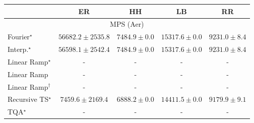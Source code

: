 \begin{tabular}{l|cccc|}
\toprule
            & ER & HH & LB & RR \\
\midrule
\multicolumn{5}{c}{\rule{0pt}{8pt}MPS (Aer)} \\
\midrule
Fourier$^\star$ & {\cellcolor[HTML]{4D004B}} \color[HTML]{F1F1F1} $56682.2\pm 2535.8$ & {\cellcolor[HTML]{F5FAFC}} \color[HTML]{000000} $7484.9\pm 0.0$ & {\cellcolor[HTML]{D4E3EF}} \color[HTML]{000000} $15317.6\pm 0.0$ & {\cellcolor[HTML]{EEF6FA}} \color[HTML]{000000} $9231.0\pm 8.4$ \\
Interp.$^\star$ & {\cellcolor[HTML]{4D004B}} \color[HTML]{F1F1F1} $56598.1\pm 2542.4$ & {\cellcolor[HTML]{F5FAFC}} \color[HTML]{000000} $7484.9\pm 0.0$ & {\cellcolor[HTML]{D4E3EF}} \color[HTML]{000000} $15317.6\pm 0.0$ & {\cellcolor[HTML]{EEF6FA}} \color[HTML]{000000} $9231.0\pm 8.4$ \\
Linear Ramp$^\star$ & {\cellcolor[HTML]{000000}} \color[HTML]{F1F1F1} {\cellcolor{white}} \color{black} - & {\cellcolor[HTML]{000000}} \color[HTML]{F1F1F1} {\cellcolor{white}} \color{black} - & {\cellcolor[HTML]{000000}} \color[HTML]{F1F1F1} {\cellcolor{white}} \color{black} - & {\cellcolor[HTML]{000000}} \color[HTML]{F1F1F1} {\cellcolor{white}} \color{black} - \\
Linear Ramp & {\cellcolor[HTML]{000000}} \color[HTML]{F1F1F1} {\cellcolor{white}} \color{black} - & {\cellcolor[HTML]{000000}} \color[HTML]{F1F1F1} {\cellcolor{white}} \color{black} - & {\cellcolor[HTML]{000000}} \color[HTML]{F1F1F1} {\cellcolor{white}} \color{black} - & {\cellcolor[HTML]{000000}} \color[HTML]{F1F1F1} {\cellcolor{white}} \color{black} - \\
Linear Ramp$^\dagger$ & {\cellcolor[HTML]{000000}} \color[HTML]{F1F1F1} {\cellcolor{white}} \color{black} - & {\cellcolor[HTML]{000000}} \color[HTML]{F1F1F1} {\cellcolor{white}} \color{black} - & {\cellcolor[HTML]{000000}} \color[HTML]{F1F1F1} {\cellcolor{white}} \color{black} - & {\cellcolor[HTML]{000000}} \color[HTML]{F1F1F1} {\cellcolor{white}} \color{black} - \\
Recursive TS$^\star$ & {\cellcolor[HTML]{F6FBFC}} \color[HTML]{000000} $7459.6\pm 2169.4$ & {\cellcolor[HTML]{F7FCFD}} \color[HTML]{000000} $6888.2\pm 0.0$ & {\cellcolor[HTML]{DAE7F1}} \color[HTML]{000000} $14411.5\pm 0.0$ & {\cellcolor[HTML]{EFF6FA}} \color[HTML]{000000} $9179.9\pm 9.1$ \\
TQA$^\star$ & {\cellcolor[HTML]{000000}} \color[HTML]{F1F1F1} {\cellcolor{white}} \color{black} - & {\cellcolor[HTML]{000000}} \color[HTML]{F1F1F1} {\cellcolor{white}} \color{black} - & {\cellcolor[HTML]{000000}} \color[HTML]{F1F1F1} {\cellcolor{white}} \color{black} - & {\cellcolor[HTML]{000000}} \color[HTML]{F1F1F1} {\cellcolor{white}} \color{black} - \\

\end{tabular}
